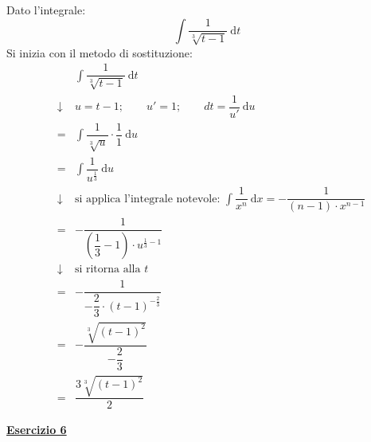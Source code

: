 \documentclass[a4paper]{article}
\newcommand{\example}[1]{\textcolor{Green4}{\textbf{#1}}}
\begin{document}
	\noindent
	Dato l'integrale:
	\begin{equation*}
		\displaystyle \int\dfrac{1}{\sqrt[3]{t-1}} \: \mathrm{d}t
	\end{equation*}
	Si inizia con il metodo di sostituzione:
	\begin{equation*}
		\begin{array}{rcl}
			&& \displaystyle \int \dfrac{1}{\sqrt[3]{t-1}} \: \mathrm{d}t \\ [2em]
			&\downarrow& u = t-1; \hspace{2em} u' = 1; \hspace{2em} dt = \dfrac{1}{u'} \: \mathrm{d}u \\ [1.5em]
			&=& \displaystyle \int \dfrac{1}{\sqrt[3]{u}} \cdot \dfrac{1}{1} \: \mathrm{d}u \\ [2em]
			&=& \displaystyle \int \dfrac{1}{u^{\frac{1}{3}}} \: \mathrm{d}u \\ [2em]
			&\downarrow& \text{si applica l'integrale notevole: }\displaystyle\int \dfrac{1}{x^{n}} \: \mathrm{d}x = - \dfrac{1}{\left(n-1\right) \cdot x^{n-1}} \\ [2em]
			&=& -\dfrac{1}{\left(\dfrac{1}{3} - 1\right) \cdot u^{\frac{1}{3}-1}} \\ [3em]
			&\downarrow& \text{si ritorna alla }t \\ [1.5em]
			&=& - \dfrac{1}{-\dfrac{2}{3} \cdot \left(t-1\right)^{-\frac{2}{3}}} \\ [2em]
			&=& - \dfrac{\sqrt[3]{\left(t-1\right)^{2}}}{-\dfrac{2}{3}} \\ [2.5em]
			&=& \dfrac{3\sqrt[3]{\left(t-1\right)^{2}}}{2}
		\end{array}
	\end{equation*}\newpage

	\begin{flushleft}
		\example{\underline{Esercizio 6}}
	\end{flushleft}
	
\end{document}
